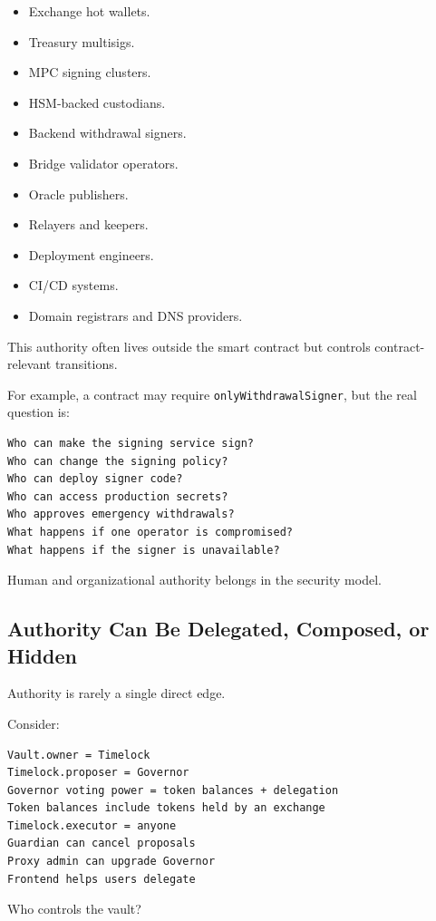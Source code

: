 \begin{itemize}
\tightlist
\item
  Exchange hot wallets.
\item
  Treasury multisigs.
\item
  MPC signing clusters.
\item
  HSM-backed custodians.
\item
  Backend withdrawal signers.
\item
  Bridge validator operators.
\item
  Oracle publishers.
\item
  Relayers and keepers.
\item
  Deployment engineers.
\item
  CI/CD systems.
\item
  Domain registrars and DNS providers.
\end{itemize}

This authority often lives outside the smart contract but controls
contract-relevant transitions.

For example, a contract may require
\passthrough{\lstinline!onlyWithdrawalSigner!}, but the real question
is:

\begin{lstlisting}
Who can make the signing service sign?
Who can change the signing policy?
Who can deploy signer code?
Who can access production secrets?
Who approves emergency withdrawals?
What happens if one operator is compromised?
What happens if the signer is unavailable?
\end{lstlisting}

Human and organizational authority belongs in the security model.

\subsection{Authority Can Be Delegated, Composed, or Hidden}

Authority is rarely a single direct edge.

Consider:

\begin{lstlisting}
Vault.owner = Timelock
Timelock.proposer = Governor
Governor voting power = token balances + delegation
Token balances include tokens held by an exchange
Timelock.executor = anyone
Guardian can cancel proposals
Proxy admin can upgrade Governor
Frontend helps users delegate
\end{lstlisting}

Who controls the vault?

